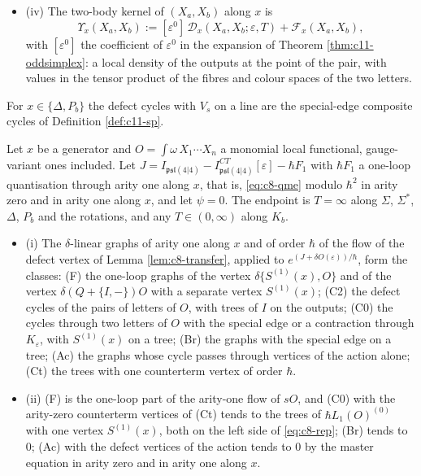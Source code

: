 \begin{definition}
\begin{itemize}
\[\]
with $\{-,-\}_{H^m}$ the bracket of \eqref{eq:c10-finitesp}.
\item (iv) The two-body kernel of $(X_a,X_b)$ along $x$ is
\[
\Upsilon_x(X_a,X_b):=[\varepsilon^0]\,\mathcal D_x(X_a,X_b;\varepsilon,T)+\mathcal F_x(X_a,X_b),
\]
with $[\varepsilon^0]$ the coefficient of $\varepsilon^0$ in the expansion of Theorem \ref{thm:c11-oddsimplex}: a local density of the outputs at the point of the pair, with values in the tensor product of the fibres and colour spaces of the two letters.
\end{itemize}
For $x\in\{\Delta,P_b\}$ the defect cycles with $V_s$ on a line are the special-edge composite cycles of Definition \ref{def:c11-sp}.
\end{definition}

\begin{theorem}
\label{thm:c11-classes}
Let $x$ be a generator and $O=\int\omega\,X_1\cdots X_n$ a monomial local functional, gauge-variant ones included. Let $J=I_{\mathfrak{psl}(4|4)}-I^{CT}_{\mathfrak{psl}(4|4)}[\varepsilon]-\hbar F_1$ with $\hbar F_1$ a one-loop quantisation through arity one along $x$, that is, \eqref{eq:c8-qme} modulo $\hbar^2$ in arity zero and in arity one along $x$, and let $\psi=0$. The endpoint is $T=\infty$ along $\Sigma$, $\Sigma^*$, $\Delta$, $P_b$ and the rotations, and any $T\in(0,\infty)$ along $K_b$.
\begin{itemize}
\item (i) The $\delta$-linear graphs of arity one along $x$ and of order $\hbar$ of the flow of the defect vertex of Lemma \ref{lem:c8-transfer}, applied to $e^{(J+\delta O(\varepsilon))/\hbar}$, form the classes: (F) the one-loop graphs of the vertex $\delta\{S^{(1)}(x),O\}$ and of the vertex $\delta(Q+\{I,-\})O$ with a separate vertex $S^{(1)}(x)$; (C2) the defect cycles of the pairs of letters of $O$, with trees of $I$ on the outputs; (C0) the cycles through two letters of $O$ with the special edge or a contraction through $K_\varepsilon$, with $S^{(1)}(x)$ on a tree; (Br) the graphs with the special edge on a tree; (Ac) the graphs whose cycle passes through vertices of the action alone; (Ct) the trees with one counterterm vertex of order $\hbar$.
\item (ii) (F) is the one-loop part of the arity-one flow of $sO$, and (C0) with the arity-zero counterterm vertices of (Ct) tends to the trees of $\hbar L_1(O)^{(0)}$ with one vertex $S^{(1)}(x)$, both on the left side of \eqref{eq:c8-rep}; (Br) tends to $0$; (Ac) with the defect vertices of the action tends to $0$ by the master equation in arity zero and in arity one along $x$.

\end{itemize}
\end{theorem}

